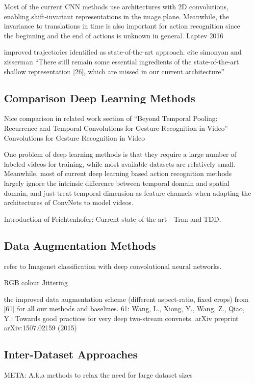 Most of the current CNN methods use architectures with 2D convolutions, enabling shift-invariant representations in the image plane. Meanwhile, the invariance to translations in time is also important for action recognition since the beginning and the end of actions is unknown in general. Laptev 2016

improved trajectories identified as state-of-the-art approach. cite simonyan and zisserman ``There still remain some essential ingredients of the state-of-the-art shallow representation [26], which are missed in our current architecture''

\subsection{Comparison Deep Learning Methods}
Nice comparison in related work section of ``Beyond Temporal Pooling:  Recurrence and Temporal Convolutions for Gesture Recognition in Video''
Convolutions for Gesture Recognition in Video

One problem of deep learning methods is that they require a large number of labeled videos for training, while most available datasets are relatively small.
Meanwhile, most of current deep learning based action recognition methods largely ignore the intrinsic difference between temporal domain and spatial domain, and just treat temporal dimension as feature channels when adapting the architectures of ConvNets to model videos.

Introduction of Feichtenhofer: Current state of the art - Tran and TDD.

\subsection{Data Augmentation Methods}

refer to Imagenet classification with deep convolutional neural networks.

RGB colour Jittering

the improved data augmentation scheme (different aspect-ratio, fixed crops)
from [61] for all our methods and baselines.
61: Wang, L., Xiong, Y., Wang, Z., Qiao, Y.: Towards good practices for very
deep two-stream convnets. arXiv preprint arXiv:1507.02159 (2015)

\subsection{Inter-Dataset Approaches}
META: A.k.a methods to relax the need for large dataset sizes

